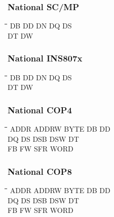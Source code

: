 \subsubsection{National SC/MP}
{\tt\begin{tabbing}
\hspace{3cm}\=\hspace{3cm}\=\hspace{3cm}\=\hspace{3cm}\=\kill
DB         \> DD          \> DN          \> DQ          \> DS \\
DT         \> DW \\
\end{tabbing}}
	
\subsubsection{National INS807x}
{\tt\begin{tabbing}
\hspace{3cm}\=\hspace{3cm}\=\hspace{3cm}\=\hspace{3cm}\=\kill
DB         \> DD          \> DN          \> DQ          \> DS \\
DT         \> DW \\
\end{tabbing}}
        
\subsubsection{National COP4}
{\tt\begin{tabbing}
\hspace{3cm}\=\hspace{3cm}\=\hspace{3cm}\=\hspace{3cm}\=\kill
ADDR       \> ADDRW       \> BYTE        \> DB          \> DD \\
DQ         \> DS          \> DSB         \> DSW         \> DT \\
FB         \> FW          \> SFR         \> WORD \\
\end{tabbing}}

\subsubsection{National COP8}
{\tt\begin{tabbing}
\hspace{3cm}\=\hspace{3cm}\=\hspace{3cm}\=\hspace{3cm}\=\kill
ADDR       \> ADDRW       \> BYTE        \> DB          \> DD \\
DQ         \> DS          \> DSB         \> DSW         \> DT \\
FB         \> FW          \> SFR         \> WORD \\
\end{tabbing}}

